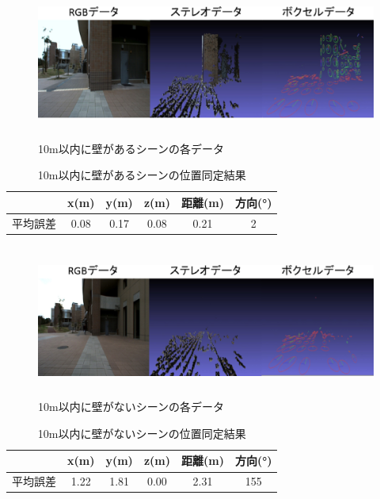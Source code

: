 %
\begin{figure}[htbp]
  \begin{center}
   \includegraphics[height=50mm]{figure/10m以内に壁があるシーン.eps}
   \caption{10m以内に壁があるシーンの各データ}
   \label{10m以内に壁があるシーン}
  \end{center}
\end{figure}
%
\begin{table}[htbp]
\begin{center}
\begin{tabular}{|c|c|c|c|c|c|} \hline
\  & x(m) & y(m) & z(m) & 距離(m) & 方向(°)\\ \hline
平均誤差 & 0.08 & 0.17 & 0.08 & 0.21 & 2\\ \hline
\end{tabular}
\caption{10m以内に壁があるシーンの位置同定結果}
\end{center}
\end{table}
%
\begin{figure}[htbp]
  \begin{center}
   \includegraphics[height=50mm]{figure/10m以内に壁がないシーン.eps}
   \caption{10m以内に壁がないシーンの各データ}
   \label{10m以内に壁がないシーン}
  \end{center}
\end{figure}
%
\begin{table}[htbp]
\begin{center}
\begin{tabular}{|c|c|c|c|c|c|} \hline
\  & x(m) & y(m) & z(m) & 距離(m) & 方向(°)\\ \hline
平均誤差 & 1.22 & 1.81 & 0.00 & 2.31 & 155\\ \hline
\end{tabular}
\caption{10m以内に壁がないシーンの位置同定結果}
\end{center}
\end{table}
